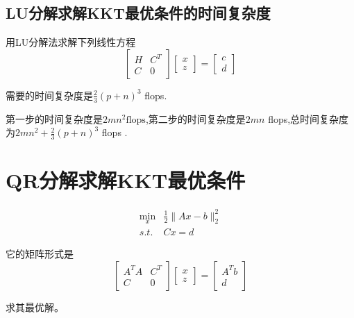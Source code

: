\subsection{LU分解求解KKT最优条件的时间复杂度}
\label{complexity:kkt-lu}

\begin{theorem}
    用LU分解法求解下列线性方程 
\begin{equation}
\left[\begin{array}{cc}
H & C^{T} \\
C & 0
\end{array}\right]\left[\begin{array}{l}
x \\
z
\end{array}\right]=\left[\begin{array}{l}
c \\
d
\end{array}\right]
\end{equation}

需要的时间复杂度是$ \frac{2}{3}(p+n)^{3} $ flops.
\end{theorem}

第一步的时间复杂度是$2 m n^{2}  \text{flops} $,第二步的时间复杂度是$2 {mn} $ flops,总时间复杂度为$ 2 m n^{2}+\frac{2}{3}(p+n)^{3} $ flops .

\section{QR分解求解KKT最优条件}

\begin{problem}
    \begin{equation}\begin{aligned}
        \min _{x} & \frac{1}{2}\|A x-b\|_{2}^{2}\\
        s.t. & C x=d
    \end{aligned}\end{equation}

    它的矩阵形式是
    \begin{equation}
\left[\begin{array}{cc}
A^{T} A & C^{T} \\
C & 0
\end{array}\right]\left[\begin{array}{l}
x \\
z
\end{array}\right]=\left[\begin{array}{c}
A^{T} b \\
d
\end{array}\right]
\end{equation}

求其最优解。
\end{problem}

